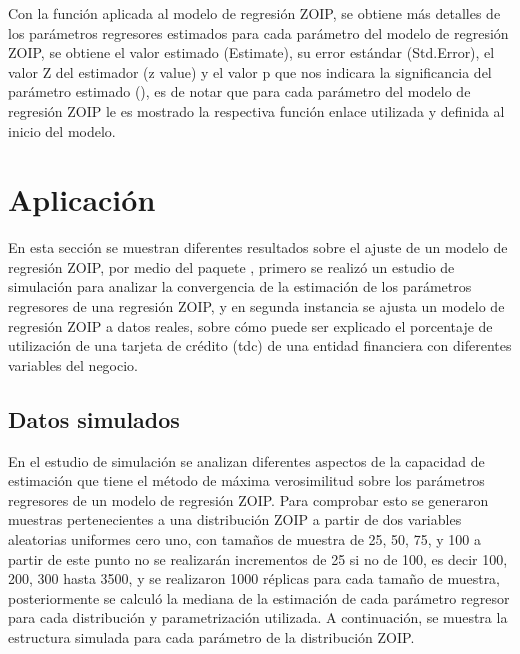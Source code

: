 Con la funci\'{o}n  aplicada al modelo de regresi\'{o}n ZOIP, se obtiene m\'{a}s detalles de los par\'{a}metros regresores estimados para cada par\'{a}metro del modelo de regresi\'{o}n ZOIP, se obtiene el valor estimado (Estimate), su error est\'{a}ndar (Std.Error), el valor Z del estimador (z value) y el valor p que nos indicara la significancia del par\'{a}metro estimado (), es de notar que para cada par\'{a}metro del modelo de regresi\'{o}n ZOIP le es mostrado la respectiva funci\'{o}n enlace utilizada y definida al inicio del modelo.

\section{Aplicaci\'{o}n}
En esta secci\'{o}n se muestran diferentes resultados sobre el ajuste de un modelo de regresi\'{o}n ZOIP, por medio del paquete , primero se realiz\'{o} un estudio de simulaci\'{o}n para analizar la convergencia de la estimaci\'{o}n de los par\'{a}metros regresores de una regresi\'{o}n ZOIP, y en segunda instancia se ajusta un modelo de regresi\'{o}n ZOIP a datos reales, sobre c\'{o}mo puede ser explicado el porcentaje de utilizaci\'{o}n de una tarjeta de cr\'{e}dito (tdc) de una entidad financiera con diferentes variables del negocio.

\subsection{Datos simulados}
En el estudio de simulaci\'{o}n se analizan diferentes aspectos de la capacidad de estimaci\'{o}n que tiene el m\'{e}todo de m\'{a}xima verosimilitud sobre los par\'{a}metros regresores de un modelo de regresi\'{o}n ZOIP. Para comprobar esto se generaron muestras pertenecientes a una distribuci\'{o}n ZOIP a partir de dos variables aleatorias uniformes cero uno, con tama\~{n}os de muestra de 25, 50, 75, y 100 a partir de este punto no se realizar\'{a}n incrementos de 25 si no de 100, es decir 100, 200, 300 hasta 3500, y se realizaron 1000 r\'{e}plicas para cada tama\~{n}o de muestra, posteriormente se calcul\'{o} la mediana de la estimaci\'{o}n de cada par\'{a}metro regresor para cada distribuci\'{o}n y parametrizaci\'{o}n utilizada. A continuaci\'{o}n, se muestra la estructura simulada para cada par\'{a}metro de la distribuci\'{o}n ZOIP.\\

